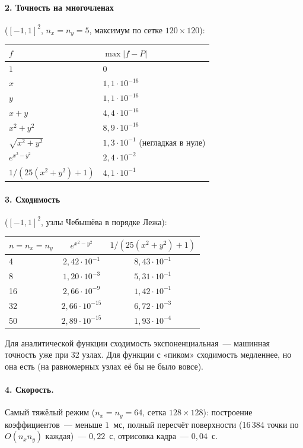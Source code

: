 \documentclass[11pt,a4paper]{report}
\begin{document}
\paragraph{2. Точность на многочленах} ($[-1,1]^2$, $n_x=n_y=5$, максимум по
сетке $120\times120$):
\begin{center}
\begin{tabular}{ll}
\toprule
$f$ & $\max|f-P|$ \\
\midrule
$1$ & $0$ \\
$x$ & $1{,}1\cdot10^{-16}$ \\
$y$ & $1{,}1\cdot10^{-16}$ \\
$x+y$ & $4{,}4\cdot10^{-16}$ \\
$x^2+y^2$ & $8{,}9\cdot10^{-16}$ \\
$\sqrt{x^2+y^2}$ & $1{,}3\cdot10^{-1}$ (негладкая в нуле) \\
$e^{x^2-y^2}$ & $2{,}4\cdot10^{-2}$ \\
$1/(25(x^2+y^2)+1)$ & $4{,}1\cdot10^{-1}$ \\
\bottomrule
\end{tabular}
\end{center}

\paragraph{3. Сходимость} ($[-1,1]^2$, узлы Чебышёва в порядке Лежа):
\begin{center}
\begin{tabular}{lcc}
\toprule
$n=n_x=n_y$ & $e^{x^2-y^2}$ & $1/(25(x^2+y^2)+1)$ \\
\midrule
4  & $2{,}42\cdot10^{-1}$ & $8{,}43\cdot10^{-1}$\\
8  & $1{,}20\cdot10^{-3}$ & $5{,}31\cdot10^{-1}$\\
16 & $2{,}66\cdot10^{-9}$ & $1{,}42\cdot10^{-1}$\\
32 & $2{,}66\cdot10^{-15}$& $6{,}72\cdot10^{-3}$\\
50 & $2{,}89\cdot10^{-15}$& $1{,}93\cdot10^{-4}$\\
\bottomrule
\end{tabular}
\end{center}
Для аналитической функции сходимость экспоненциальная~--- машинная точность уже
при 32 узлах. Для функции с «пиком» сходимость медленнее, но она есть
(на равномерных узлах её бы не было вовсе).

\paragraph{4. Скорость.} Самый тяжёлый режим ($n_x=n_y=64$, сетка
$128\times128$): построение коэффициентов~--- меньше $1$~мс, полный пересчёт
поверхности (16\,384 точки по $O(n_xn_y)$ каждая)~--- $0{,}22$~с, отрисовка
кадра~--- $0{,}04$~с.
\end{document}
